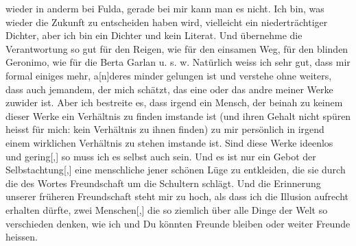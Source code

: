                wieder in anderm bei Fulda, gerade bei mir
               kann man es nicht. Ich bin\introOben{},\introOben{} was wieder die Zukunft zu
               entscheiden haben wird, vielleicht ein niederträchtiger Dichter, aber ich bin ein
               Dichter und kein Literat. Und übernehme die Verantwortung so gut für den Reigen, wie für den einsamen Weg, für den blinden
                  Geronimo, wie für die Berta Garlan u. s.
               w. Natürlich weiss ich sehr gut, dass mir formal einiges mehr,
                  a{[}n{]}deres minder gelungen ist und verstehe ohne weiters, dass
               auch jemand\introOben{}em\introOben{}, der mich schätzt, das eine oder das andre
               meiner Werke zuwider ist. Aber ich bestreite es, dass irgend ein Mensch, der beinah
               zu keinem dieser Werke ein Verhältnis zu finden imstande ist (und ihren Gehalt nicht
               spüren heisst für mich\introOben{}:\introOben{} kein Verhältnis zu ihnen finden) zu
               mir persönlich in irgend einem wirklichen Verhältnis zu stehen imstande {\pb}ist. Sind diese Werke ideenlos und
                  gering{[},{]} so muss ich es selbst auch sein. Und es ist nur ein
               Gebot der Selbstachtung{[},{]} eine menschliche \label{T_L03520-5v}\label{T_L03520-5} jener
               schönen Lüge zu entkleiden, die sie durch die \label{T_L03520-6v}\label{T_L03520-6} des  Wortes Freundschaft um die Schultern schlägt. Und die Erinnerung
               unserer früheren Freundschaft steht mir zu hoch, als dass ich die Illusion aufrecht
               erhalten dürfte, zwei Menschen{[},{]} die so ziemlich über alle Dinge
               der Welt so verschieden denken, wie ich und Du könnten Freunde bleiben oder weiter
               Freunde heissen.\pend
           \endnumbering{}  
      